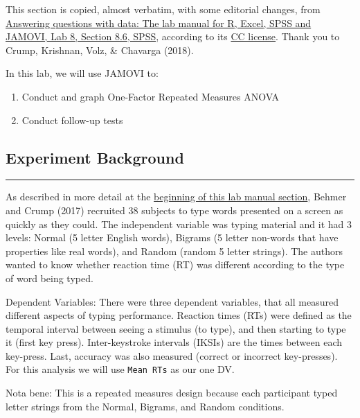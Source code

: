 \documentclass[
]{book}
\providecommand{\tightlist}{%
  \setlength{\itemsep}{0pt}\setlength{\parskip}{0pt}}
\begin{document}
This section is copied, almost verbatim, with some editorial changes, from \href{https://www.erinmazerolle.com/statisticsLab/lab-8-repeated-measures-anova.html\#spss-8}{Answering questions with data: The lab manual for R, Excel, SPSS and JAMOVI, Lab 8, Section 8.6, SPSS}, according to its \href{https://creativecommons.org/licenses/by-sa/4.0/deed.ast}{CC license}. Thank you to Crump, Krishnan, Volz, \& Chavarga (2018).

In this lab, we will use JAMOVI to:

\begin{enumerate}
\def\labelenumi{\arabic{enumi}.}
\tightlist
\item
  Conduct and graph One-Factor Repeated Measures ANOVA
\item
  Conduct follow-up tests
\end{enumerate}

\hypertarget{experiment-background-6}{%
\subsection{Experiment Background}\label{experiment-background-6}}

\begin{center}\rule{0.5\linewidth}{0.5pt}\end{center}

As described in more detail at the \href{https://www.erinmazerolle.com/statisticsLab/lab-8-repeated-measures-anova.html\#betcha-cant-type-jhdbzkco-very-fast-on-your-first-try}{beginning of this lab manual section}, Behmer and Crump (2017) recruited 38 subjects to type words presented on a screen as quickly as they could. The independent variable was typing material and it had 3 levels: Normal (5 letter English words), Bigrams (5 letter non-words that have properties like real words), and Random (random 5 letter strings). The authors wanted to know whether reaction time (RT) was different according to the type of word being typed.

Dependent Variables: There were three dependent variables, that all measured different aspects of typing performance. Reaction times (RTs) were defined as the temporal interval between seeing a stimulus (to type), and then starting to type it (first key press). Inter-keystroke intervals (IKSIs) are the times between each key-press. Last, accuracy was also measured (correct or incorrect key-presses). For this analysis we will use \texttt{Mean\ RTs} as our one DV.

Nota bene: This is a repeated measures design because each participant typed letter strings from the Normal, Bigrams, and Random conditions.
\end{document}

